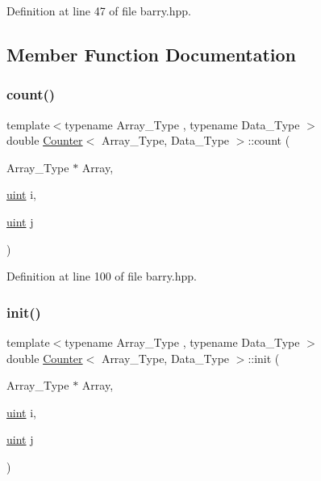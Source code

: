Definition at line 47 of file barry.\+hpp.



\subsection{Member Function Documentation}
\mbox{\label{classbarry_1_1_counter_afe1d23e72c3bdca9b2481f36ebde1d95}} 
\subsubsection{\texorpdfstring{count()}{count()}}
{\footnotesize\ttfamily template$<$typename Array\+\_\+\+Type , typename Data\+\_\+\+Type $>$ \\
double \hyperlink{classbarry_1_1_counter}{Counter}$<$ Array\+\_\+\+Type, Data\+\_\+\+Type $>$\+::count (\begin{DoxyParamCaption}\item[{Array\+\_\+\+Type $\ast$}]{Array,  }\item[{\hyperlink{namespacebarry_a11dfc53ddb4672278319aa04f1e09a6c}{uint}}]{i,  }\item[{\hyperlink{namespacebarry_a11dfc53ddb4672278319aa04f1e09a6c}{uint}}]{j }\end{DoxyParamCaption})\hspace{0.3cm}{\ttfamily [inline]}}



Definition at line 100 of file barry.\+hpp.

\mbox{\label{classbarry_1_1_counter_ae0451979ddc51a5fbf00de78c37d3216}} 
\subsubsection{\texorpdfstring{init()}{init()}}
{\footnotesize\ttfamily template$<$typename Array\+\_\+\+Type , typename Data\+\_\+\+Type $>$ \\
double \hyperlink{classbarry_1_1_counter}{Counter}$<$ Array\+\_\+\+Type, Data\+\_\+\+Type $>$\+::init (\begin{DoxyParamCaption}\item[{Array\+\_\+\+Type $\ast$}]{Array,  }\item[{\hyperlink{namespacebarry_a11dfc53ddb4672278319aa04f1e09a6c}{uint}}]{i,  }\item[{\hyperlink{namespacebarry_a11dfc53ddb4672278319aa04f1e09a6c}{uint}}]{j }\end{DoxyParamCaption})\hspace{0.3cm}{\ttfamily [inline]}}



